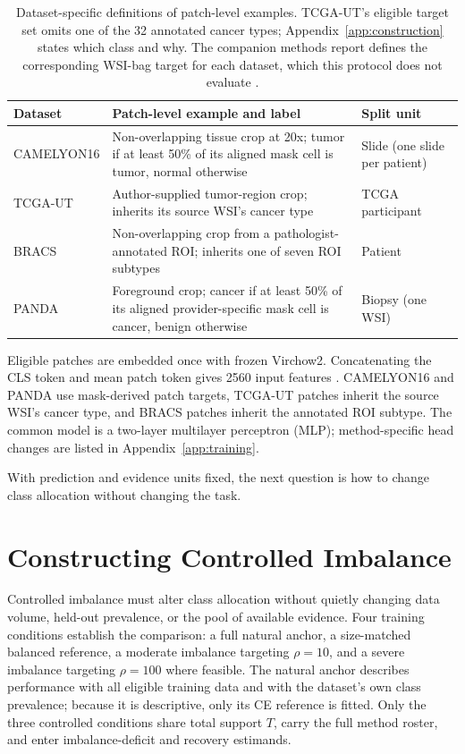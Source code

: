 \documentclass[11pt]{article}
\begin{document}
\begin{table}[ht]
  \centering
  \scriptsize
  \begin{tabularx}{\linewidth}{@{}l>{\raggedright\arraybackslash}X>{\raggedright\arraybackslash}X@{}}
    \toprule
    Dataset & Patch-level example and label & Split unit \\
    \midrule
    CAMELYON16 & Non-overlapping tissue crop at \num{20}x; tumor if at least \num{50}\% of its aligned mask cell is tumor, normal otherwise & Slide (one slide per patient) \\
    TCGA-UT & Author-supplied tumor-region crop; inherits its source WSI's cancer type & TCGA participant \\
    BRACS & Non-overlapping crop from a pathologist-annotated ROI; inherits one of seven ROI subtypes & Patient \\
    PANDA & Foreground crop; cancer if at least \num{50}\% of its aligned provider-specific mask cell is cancer, benign otherwise & Biopsy (one WSI) \\
    \bottomrule
  \end{tabularx}
  \caption{Dataset-specific definitions of patch-level examples. TCGA-UT's eligible target set omits one of the 32 annotated cancer types; Appendix~\ref{app:construction} states which class and why. The companion methods report defines the corresponding WSI-bag target for each dataset, which this protocol does not evaluate \citep{queisler2026imbalanceMethods}.}
  \label{tab:datasets}
\end{table}

Eligible patches are embedded once with frozen Virchow2. Concatenating the CLS token and mean patch token gives 2560 input features \citep{vorontsov2024virchow,zimmermann2024virchow2}. CAMELYON16 and PANDA use mask-derived patch targets, TCGA-UT patches inherit the source WSI's cancer type, and BRACS patches inherit the annotated ROI subtype. The common model is a two-layer multilayer perceptron (MLP); method-specific head changes are listed in Appendix~\ref{app:training}.

With prediction and evidence units fixed, the next question is how to change class allocation without changing the task.

\section{Constructing Controlled Imbalance}
\label{sec:construction}
Controlled imbalance must alter class allocation without quietly changing data volume, held-out prevalence, or the pool of available evidence. Four training conditions establish the comparison: a full natural anchor, a size-matched balanced reference, a moderate imbalance targeting $\rho=10$, and a severe imbalance targeting $\rho=100$ where feasible. The natural anchor describes performance with all eligible training data and with the dataset's own class prevalence; because it is descriptive, only its CE reference is fitted. Only the three controlled conditions share total support $T$, carry the full method roster, and enter imbalance-deficit and recovery estimands.
\end{document}
